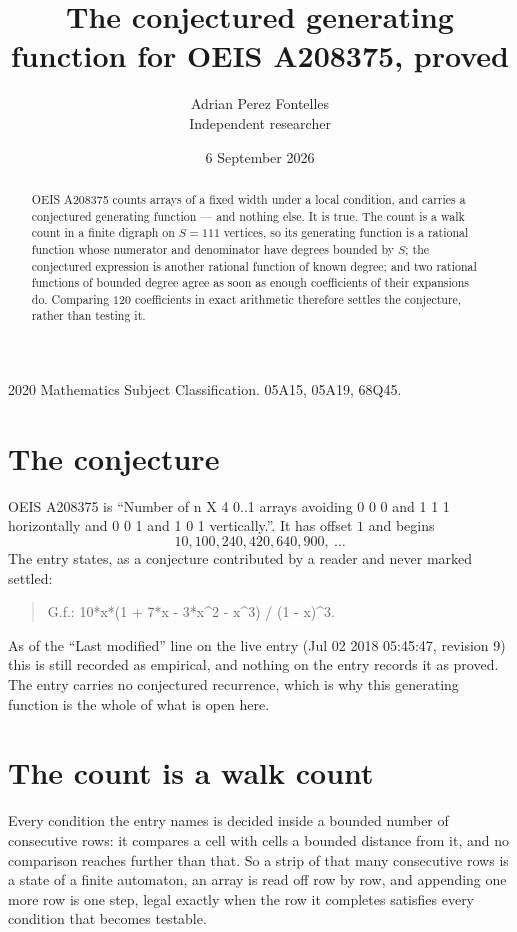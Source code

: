 \documentclass[11pt,a4paper]{article}
\title{The conjectured generating function for OEIS A208375, proved}
\author{Adrian Perez Fontelles\\ \small Independent researcher}
\date{6 September 2026}
\theoremstyle{plain}
\theoremstyle{definition}
\begin{document}
\maketitle

\begin{abstract}
OEIS A208375 counts arrays of a fixed width under a local condition, and carries a conjectured
generating function --- and nothing else. It is true. The count is a walk count in a finite
digraph on $S=111$ vertices, so its generating function is a rational function whose numerator
and denominator have degrees bounded by $S$; the conjectured expression is another rational
function of known degree; and two rational functions of bounded degree agree as soon as enough
coefficients of their expansions do. Comparing $120$ coefficients in exact arithmetic
therefore settles the conjecture, rather than testing it.
\end{abstract}

\noindent\small 2020 Mathematics Subject Classification. 05A15, 05A19, 68Q45.\normalsize

\section{The conjecture}

OEIS A208375 is ``Number of n X 4 0..1 arrays avoiding 0 0 0 and 1 1 1 horizontally and 0 0 1 and 1 0 1 vertically.''. It has offset $1$ and begins
\[
10, 100, 240, 420, 640, 900,\ \dots
\]
The entry states, as a conjecture contributed by a reader and never marked settled:
\begin{quote}
G.f.: 10*x*(1 + 7*x - 3*x\^{}2 - x\^{}3) / (1 - x)\^{}3.
\end{quote}
As of the ``Last modified'' line on the live entry (Jul 02 2018 05:45:47, revision 9) this is still
recorded as empirical, and nothing on the entry records it as proved. The entry carries no
conjectured recurrence, which is why this generating function is the whole of what is open
here.

\section{The count is a walk count}

Every condition the entry names is decided inside a bounded number of consecutive rows: it
compares a cell with cells a bounded distance from it, and no comparison reaches further than
that. So a strip of that many consecutive rows is a state of a finite automaton, an array is
read off row by row, and appending one more row is one step, legal exactly when the row it
completes satisfies every condition that becomes testable.
\end{document}
